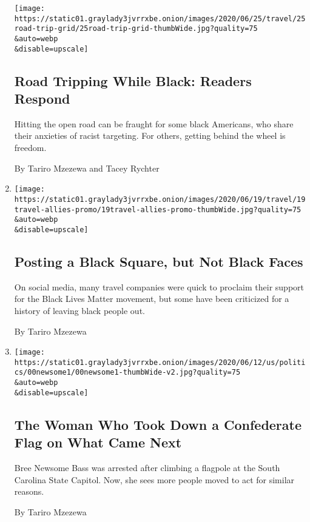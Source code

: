 \begin{enumerate}
  \texttt{[image: https://static01.graylady3jvrrxbe.onion/images/2020/06/25/travel/25road-trip-grid/25road-trip-grid-thumbWide.jpg?quality=75\\\&auto=webp\\\&disable=upscale]}

  \hypertarget{road-tripping-while-black-readers-respond}{%
  \subsection{Road Tripping While Black: Readers
  Respond}\label{road-tripping-while-black-readers-respond}}

  Hitting the open road can be fraught for some black Americans, who
  share their anxieties of racist targeting. For others, getting behind
  the wheel is freedom.

  By Tariro Mzezewa and Tacey Rychter
\item
  \href{/2020/06/20/travel/travel-brands-black-lives-matter.html}{}

  \texttt{[image: https://static01.graylady3jvrrxbe.onion/images/2020/06/19/travel/19travel-allies-promo/19travel-allies-promo-thumbWide.jpg?quality=75\\\&auto=webp\\\&disable=upscale]}

  \hypertarget{posting-a-black-square-but-not-black-faces}{%
  \subsection{Posting a Black Square, but Not Black
  Faces}\label{posting-a-black-square-but-not-black-faces}}

  On social media, many travel companies were quick to proclaim their
  support for the Black Lives Matter movement, but some have been
  criticized for a history of leaving black people out.

  By Tariro Mzezewa
\item
  \href{/2020/06/14/us/politics/bree-newsome-bass-confederate-flag.html}{}

  \texttt{[image: https://static01.graylady3jvrrxbe.onion/images/2020/06/12/us/politics/00newsome1/00newsome1-thumbWide-v2.jpg?quality=75\\\&auto=webp\\\&disable=upscale]}

  \hypertarget{the-woman-who-took-down-a-confederate-flag-on-what-came-next}{%
  \subsection{The Woman Who Took Down a Confederate Flag on What Came
  Next}\label{the-woman-who-took-down-a-confederate-flag-on-what-came-next}}

  Bree Newsome Bass was arrested after climbing a flagpole at the South
  Carolina State Capitol. Now, she sees more people moved to act for
  similar reasons.

  By Tariro Mzezewa
\end{enumerate}

